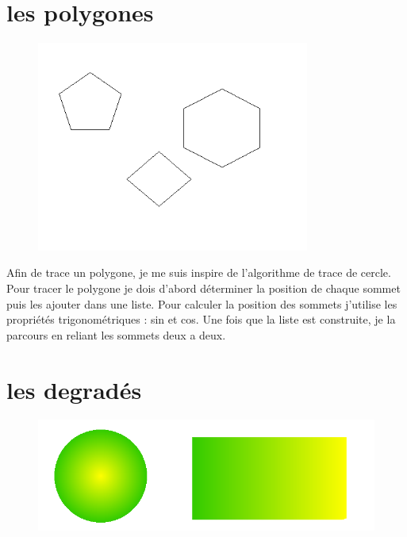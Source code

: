 \documentclass[12pt, a4paper]{report}
\begin{document}
\newpage

\section {les polygones }


\begin{figure}[!h]
\begin{center} \includegraphics[width=0.8\textwidth]{images/poly.png} \end{center}
\end{figure}

Afin de trace un polygone, je me suis inspire de l’algorithme de trace de cercle. Pour tracer le polygone je dois d’abord déterminer la position de chaque sommet puis les ajouter dans une liste. Pour calculer la position des sommets j’utilise les propriétés trigonométriques : sin et cos. Une fois que la liste est construite, je la parcours en reliant les sommets deux a deux.


\newpage

\section {les degradés }



\begin{figure}[!h]
\begin{center} \includegraphics[width=1\textwidth]{images/degrader.png} \end{center}
\end{figure}
\end{document}
